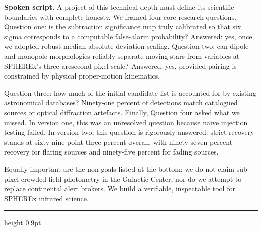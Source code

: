 \documentclass[11pt,a4paper]{article}
\newcommand{\arcsec}{\ensuremath{{}^{\prime\prime}}}
\newcommand{\slidehead}[3]{%
  \sbox{\slideheadbox}{\large\bfseries Slide #1 --- #2\hspace{1em plus 1fill}#3}%
  \noindent\ifdim\wd\slideheadbox>\linewidth
    \resizebox{\linewidth}{!}{\usebox{\slideheadbox}}%
  \else
    \makebox[\linewidth][s]{\usebox{\slideheadbox}}%
  \fi\par
  \vspace{2pt}\hrule height 0.9pt\vspace{8pt}}
\begin{document}
{}

\textbf{Spoken script.} A project of this technical depth must define its scientific boundaries with complete honesty. We framed four core research questions. Question one: is the subtraction significance map truly calibrated so that six sigma corresponds to a computable false-alarm probability? Answered: yes, once we adopted robust median absolute deviation scaling. Question two: can dipole and monopole morphologies reliably separate moving stars from variables at SPHEREx's three-arcsecond pixel scale? Answered: yes, provided pairing is constrained by physical proper-motion kinematics.

Question three: how much of the initial candidate list is accounted for by existing astronomical databases? Ninety-one percent of detections match catalogued sources or optical diffraction artefacts. Finally, Question four asked what we missed. In version one, this was an unresolved question because naive injection testing failed. In version two, this question is rigorously answered: strict recovery stands at sixty-nine point three percent overall, with ninety-seven percent recovery for flaring sources and ninety-five percent for fading sources.

Equally important are the non-goals listed at the bottom: we do not claim sub-pixel crowded-field photometry in the Galactic Center, nor do we attempt to replace continental alert brokers. We build a verifiable, inspectable tool for SPHEREx infrared science.
\newpage
\slidehead{5}{Prior art I: the subtraction lineage}{1:00}
\end{document}

